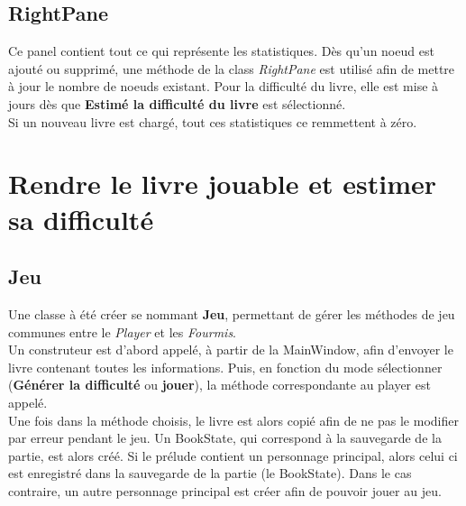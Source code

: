 		\subsection{RightPane}

		Ce panel contient tout ce qui représente les statistiques. Dès qu'un noeud est ajouté ou supprimé, une méthode de la class \textit{RightPane} est utilisé afin de mettre à jour le nombre de noeuds existant. Pour la difficulté du livre, elle est mise à jours dès que \textbf{Estimé la difficulté du livre} est sélectionné.\\
		Si un nouveau livre est chargé, tout ces statistiques ce remmettent à zéro.



	\section{Rendre le livre jouable et estimer sa difficulté}\label{sec:Jeu}
		\subsection{Jeu}
		Une classe à été créer se nommant \textbf{Jeu}, permettant de gérer les méthodes de jeu communes entre le \textit{Player} et les \textit{Fourmis}.\\
		Un construteur est d'abord appelé, à partir de la MainWindow, afin d'envoyer le livre contenant toutes les informations. Puis, en fonction du mode sélectionner (\textbf{Générer la difficulté} ou \textbf{jouer}), la méthode correspondante au player est appelé.\\
		Une fois dans la méthode choisis, le livre est alors copié afin de ne pas le modifier par erreur pendant le jeu. Un BookState, qui correspond à la sauvegarde de la partie, est alors créé. Si le prélude contient un personnage principal, alors celui ci est enregistré dans la sauvegarde de la partie (le BookState). Dans le cas contraire, un autre personnage principal est créer afin de pouvoir jouer au jeu.

